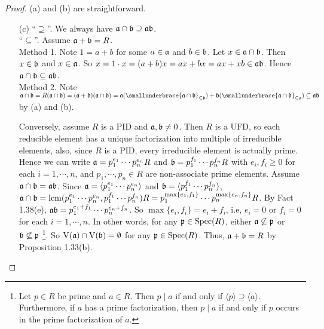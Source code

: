 \begin{proof}
    (a) and (b) are straightforward.
    \begin{enumerate}
        \item [(c)]
            ``$\supseteq$''. We always have $\mathfrak{a} \cap \mathfrak{b} \supseteq \mathfrak{a} \mathfrak{b}$. \\
            ``$\subseteq$''. Assume $\mathfrak{a} + \mathfrak{b} = R$.  \\
            Method 1. Note $1 = a+b$ for some $a \in \mathfrak{a}$ and $b \in \mathfrak{b}$. Let $x \in \mathfrak{a} \cap \mathfrak{b}$. Then $x \in \mathfrak{b}$ and $x \in \mathfrak{a}$. So $x = 1 \cdot x = (a+b)x = ax + bx = ax + xb \in \operatorname{\mathfrak{a} \mathfrak{b}}$. Hence $\mathfrak{a} \cap \mathfrak{b} \subseteq \mathfrak{a} \mathfrak{b}$. \\
            Method 2. Note $\ffa \cap \ffb = R(\ffa \cap \ffb) = (\ffa + \ffb)(\ffa \cap \ffb) = \ffa(\smallunderbrace{\ffa \cap \ffb}_{\subseteq \ffb}) + \ffb(\smallunderbrace{\ffa \cap \ffb}_{\subseteq \ffa}) \subseteq \ffa \ffb$ by (a) and (b). \par
            Conversely, assume $R$ is a PID and $\mathfrak{a},\mathfrak{b} \neq 0$. Then $R$ is a UFD, so each reducible element has a unique factorization into multiple of irreducible elements, also, since $R$ is a PID, every irreducible element is actually prime.  Hence we can write $\mathfrak{a} = p_1^{e_1} \cdots p_n^{e_n} R$ and $\mathfrak{b} = p_1^{f_1} \cdots p_n^{f_n}R$ with $e_i,f_i \geq 0$ for each $i = 1,\cdots,n$, and $p_1,\cdots,p_n \in R$ are non-associate prime elements. Assume $\mathfrak{a} \cap \mathfrak{b} = \mathfrak{a} \mathfrak{b}$. Since $\mathfrak{a} = \langle p_1^{e_1} \cdots p_n^{e_n} \rangle$ and $\mathfrak{b} = \langle p_1^{f_1} \cdots p_n^{f_n} \rangle$, $\mathfrak{a} \cap \mathfrak{b} = \operatorname{lcm}(p_1^{e_1} \cdots p_n^{e_n},p_1^{f_1} \cdots p_n^{f_n})R = p_1^{\max\{e_1,f_1\}} \cdots p_n^{\max\{e_n,f_n\}}R$. By Fact 1.38(e), $\mathfrak{a}\mathfrak{b} = p_1^{e_1+f_1} \cdots p_n^{e_n+f_n}$. So $\max\{e_i,f_i\} = e_i + f_i$, i.e, $e_i = 0$ or $f_i = 0$ for each $i = 1,\cdots,n$. In other words, for any $\mathfrak{p} \in \operatorname{Spec}(R)$, either $\mathfrak{a} \not \subseteq \mathfrak{p}$ or $\mathfrak{b} \not \subseteq \mathfrak{p}$ \footnote[2]{Let $p \in R$ be prime and $a \in R$. Then $p \mid a$ if and only if $\langle p \rangle \supseteq \langle a \rangle$. Furthermore, if $a$ has a prime factorization, then $p \mid a$ if and only if $p$ occurs in the prime factorization of $a$.}. So $\operatorname{V}(\mathfrak{a}) \cap \operatorname{V}(\mathfrak{b}) = \emptyset$ for any $\mathfrak{p} \in \operatorname{Spec}(R)$. Thus, $\mathfrak{a} + \mathfrak{b} = R$ by Proposition 1.33(b). \qedhere
    \end{enumerate}
\end{proof}

